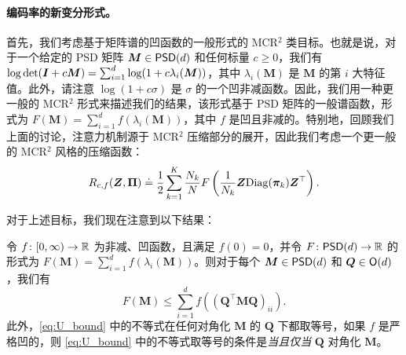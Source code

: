\documentclass[../../book-main.tex]{subfiles}
\begin{document}

\paragraph{编码率的新变分形式。} 首先，我们考虑基于矩阵谱的凹函数的一般形式的 MCR$^2$ 类目标。也就是说，对于一个给定的 PSD 矩阵 $\bm M \in \mathsf{PSD}(d)$ 和任何标量 $c \geq 0$，我们有 $\log \det (\bm{I} + c \bm M) = \sum_{i=1}^{d} \log( 1 + c \lambda_i(\bm M))$，其中 $\lambda_i (\bm M)$ 是 $\bm M$ 的第 $i$ 大特征值。此外，请注意 $\log(1 + c \sigma)$ 是 $\sigma$ 的一个凹非减函数。因此，我们用一种更一般的 MCR$^2$ 形式来描述我们的结果，该形式基于 PSD 矩阵的一般谱函数，形式为 $F(\bm M) = \sum_{i=1}^{d} f(\lambda_i(\bm M))$，其中 $f$ 是凹且非减的。特别地，回顾我们上面的讨论，注意力机制源于 MCR$^2$ 压缩部分的展开，因此我们考虑一个更一般的 MCR$^2$ 风格的压缩函数：
\vspace{-2mm}
\begin{equation}
    R_{c,f}(\bm Z, \bm \Pi) \doteq \frac{1}{2}\sum_{k=1}^K \frac{N_k}{N} F\left( \frac{1}{N_k}\bm{Z} \mathrm{Diag}(\bm \pi_k) \bm{Z}^{\top} \right).
    \label{eq:mcr_c_gen}
\end{equation}



对于上述目标，我们现在注意到以下结果：
\begin{theorem}
\label{thm:var_concave}
    令 \(f \colon [0, \infty) \to \mathbb{R}\) 为非减、凹函数，且满足 \(f(0) = 0\)，并令 \(F \colon \mathsf{PSD}(d) \to \mathbb{R}\) 的形式为 \(F(\bm M) = \sum_{i = 1}^{d}f(\lambda_{i}(\bm M))\)。则对于每个 \(\bm M \in \mathsf{PSD}(d)\) 和 \(\bm Q \in \mathsf{O}(d)\)，我们有
    \begin{equation}
        \label{eq:U_bound}
        F(\bm M) \leq  \sum_{i=1}^{d} f\left( (\bm Q^{\top} \bm M \bm Q)_{ii} \right).
    \end{equation}
    此外，\eqref{eq:U_bound} 中的不等式在任何对角化 $\bm M$ 的 $\bm Q$ 下都取等号，如果 $f$ 是严格凹的，则 \eqref{eq:U_bound} 中的不等式取等号的条件是\textit{当且仅当} $\bm Q$ 对角化 $\bm M$。
\end{theorem}
\end{document}
